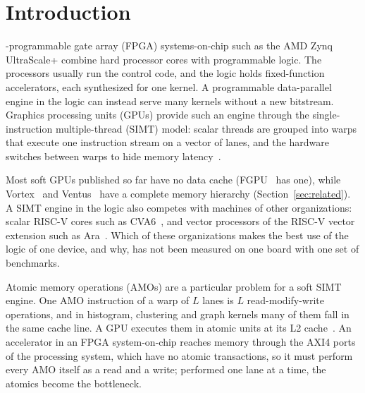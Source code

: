 \documentclass[journal]{IEEEtran}
\begin{document}
\section{Introduction}
-programmable gate array (FPGA) systems-on-chip such as the
AMD Zynq UltraScale+ combine hard processor cores with programmable logic. The
processors usually run the control code, and the logic holds fixed-function
accelerators, each synthesized for one kernel. A programmable data-parallel engine in
the logic can instead serve many kernels without a new bitstream. Graphics processing
units (GPUs) provide such an engine through the single-instruction multiple-thread
(SIMT) model: scalar threads are grouped into warps that execute one instruction
stream on a vector of lanes, and the hardware switches between warps to hide memory
latency~\cite{tesla,aamodt}.

Most soft GPUs published so far have no data cache (FGPU~\cite{fgpu} has one), while
Vortex~\cite{vortex} and Ventus~\cite{ventus25} have a complete memory hierarchy
(Section~\ref{sec:related}). A SIMT engine in the logic also competes with machines of
other organizations: scalar RISC-V cores such as CVA6~\cite{cva6}, and vector
processors of the RISC-V vector extension such as Ara~\cite{ara,ara2}. Which of these
organizations makes the best use of the logic of one device, and why, has not been
measured on one board with one set of benchmarks.

Atomic memory operations (AMOs) are a particular problem for a soft SIMT engine. One
AMO instruction of a warp of $L$ lanes is $L$ read-modify-write operations, and in
histogram, clustering and graph kernels many of them fall in the same cache line. A
GPU executes them in atomic units at its L2 cache~\cite{fermi}. An accelerator in an
FPGA system-on-chip reaches memory through the AXI4 ports of the processing system,
which have no atomic transactions, so it must perform every AMO itself as a read and a
write; performed one lane at a time, the atomics become the bottleneck.
\end{document}

